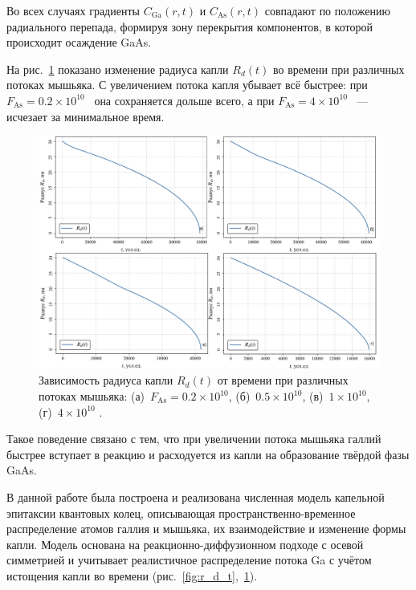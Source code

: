 \documentclass[14pt,oneside]{extarticle}
\begin{document}
Во всех случаях градиенты $C_{\text{Ga}}(r, t)$ и $C_{\text{As}}(r, t)$ совпадают по положению радиального перепада, формируя зону перекрытия компонентов, в которой происходит осаждение GaAs.

На рис.~\ref{fig:r_d_flux_2} показано изменение радиуса капли $R_d(t)$ во времени при различных потоках мышьяка. С увеличением потока капля убывает всё быстрее: при $F_{\text{As}} = 0.2 \times 10^{10}$~ она сохраняется дольше всего, а при $F_{\text{As}} = 4 \times 10^{10}$~ — исчезает за минимальное время.

\begin{figure}[H]
    \begin{center}
    \includegraphics[width=15cm]{images/R_d_t_2.png}
    \caption{\label{fig:r_d_flux_2} Зависимость радиуса капли $R_d(t)$ от времени при различных потоках мышьяка: (а)~$F_{\text{As}} = 0.2 \times 10^{10}$, (б)~$0.5 \times 10^{10}$, (в)~$1 \times 10^{10}$, (г)~$4 \times 10^{10}$ .}
    \end{center}
\end{figure}

Такое поведение связано с тем, что при увеличении потока мышьяка галлий быстрее вступает в реакцию и расходуется из капли на образование твёрдой фазы GaAs. 

\pagebreak
{}

В данной работе была построена и реализована численная модель капельной эпитаксии квантовых колец, описывающая пространственно-временное распределение атомов галлия и мышьяка, их взаимодействие и изменение формы капли. Модель основана на реакционно-диффузионном подходе с осевой симметрией и учитывает реалистичное распределение потока Ga с учётом истощения капли во времени (рис.~\ref{fig:r_d_t},~\ref{fig:r_d_flux_2}).
\end{document}
